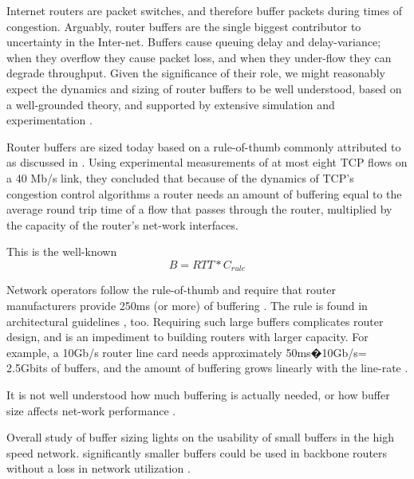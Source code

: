 \documentclass[letterpaper]{article}
\begin{document}
\par Internet routers are packet switches, and therefore buffer packets during times of congestion.  Arguably, router buffers are the single biggest contributor to uncertainty in the Inter-net. Buffers cause queuing delay and delay-variance; when they overflow they cause packet loss, and when they under-flow they can degrade throughput. Given the significance of their role, we might reasonably expect the dynamics and sizing of router buffers to be well understood, based on a well-grounded theory, and supported by extensive simulation and experimentation \cite{REF1}.

\par Router buffers are sized today based on a rule-of-thumb commonly attributed to as discussed in \cite{REF3} . Using experimental measurements of at most eight TCP flows on a 40 Mb/s link, they concluded that because of the dynamics of TCP's congestion control algorithms  a router needs an amount of buffering equal to the average round trip time of a flow that passes through the router, multiplied by the capacity of the router's net-work interfaces. 
\par This is the well-known \cite{REF1}
\begin{equation}
B = RTT * C_{rule}
\end{equation}

\par Network operators follow the rule-of-thumb and require that router manufacturers provide 250ms (or more) of buffering \cite{REF4}. The rule is found in architectural guidelines \cite{REF5}, too. Requiring such large buffers complicates router design, and is an impediment to building routers with larger capacity. For example, a 10Gb/s router line card needs approximately 50ms�10Gb/s= 2.5Gbits of buffers, and the amount of buffering grows linearly with the line-rate \cite{REF2}.

\par It is not well understood how much buffering is actually needed, or how buffer size affects net-work performance \cite{REF6}.

\par Overall  study of buffer sizing lights on the usability of small buffers in the high speed network.  significantly smaller buffers could be used in backbone routers  without a loss in network utilization \cite{REF1}.
\end{document}
